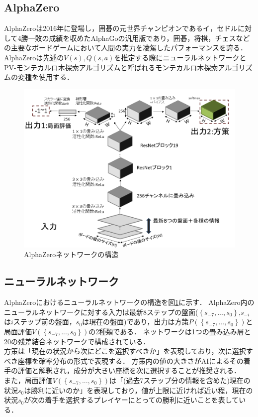 \subsection{AlphaZero}
AlphaZeroは2016年に登場し，囲碁の元世界チャンピオンであるイ，セドルに対して4勝一敗の成績を収めたAlphaGoの汎用版であり，囲碁，将棋，チェスなどの主要なボードゲームにおいて人間の実力を凌駕したパフォーマンスを誇る．
AlphaZeroは先述の$V(s),Q(s, a)$を推定する際にニューラルネットワークとPV-モンテカルロ木探索アルゴリズムと呼ばれるモンテカルロ木探索アルゴリズムの変種を使用する．
\begin{figure}[htbp]
	\centering
	\includegraphics[width=\linewidth]{./figure/network.png}
	\caption{AlphaZeroネットワークの構造}
	\label{fig:network}
\end{figure}
\subsection{ニューラルネットワーク}
AlphaZeroにおけるニューラルネットワークの構造を図\ref{fig:network}に示す．
AlphaZero内のニューラルネットワークに対する入力は最新$8$ステップの盤面($\left\{ s_{-7}, ..., s_0 \right\}$,$s_{-i}$は$i$ステップ前の盤面，$s_{0}$は現在の盤面)であり，出力は方策$P(\left\{ s_{-7}, ..., s_0 \right\})$と
局面評価$V(\left\{ s_{-7}, ..., s_0 \right\})$の2種類である．
ネットワークは1つの畳み込み層と20の残差結合ネットワークで構成されている．  \\
方策は「現在の状況から次にどこを選択すべきか」を表現しており，次に選択すべき座標を確率分布の形式で表現する．
方策内の値の大きさがAIによるその着手の評価と解釈され，成分が大きい座標を次に選択することが推奨される．\\
また，局面評価$V(\left\{ s_{-7}, ..., s_0 \right\})$は「(過去7ステップ分の情報を含めた)現在の状況$s_0$は勝利に近いのか」を表現しており，値が上限に近ければ近い程，現在の状況$s_0$が次の着手を選択するプレイヤーにとっての勝利に近いことを表している．

